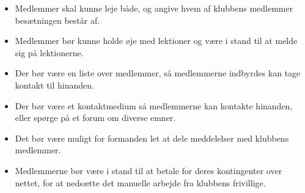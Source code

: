 \begin{itemize}
	\item Medlemmer skal kunne leje både, og angive hvem af klubbens medlemmer besætningen består af.
	\item Medlemmer bør kunne holde øje med lektioner og være i stand til at melde sig på lektionerne.
	\item Der bør være en liste over medlemmer, så medlemmerne indbyrdes kan tage kontakt til hinanden.
	\item Der bør være et kontaktmedium så medlemmerne kan kontakte hinanden, eller spørge på et forum om diverse emner.
	\item Det bør være muligt for formanden let at dele meddelelser med klubbens medlemmer. 
	\item Medlemmerne bør være i stand til at betale for deres kontingenter over nettet, for at nedsætte det manuelle arbejde fra klubbens frivillige.
\end{itemize}
\cbend
